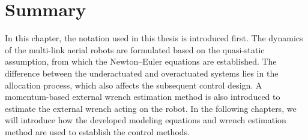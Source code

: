 \section{Summary}
In this chapter, the notation used in this thesis is introduced first. The dynamics of the multi-link aerial robots are formulated based on the quasi-static assumption, from which the Newton--Euler equations are established. The difference between the underactuated and overactuated systems lies in the allocation process, which also affects the subsequent control design. A momentum-based external wrench estimation method is also introduced to estimate the external wrench acting on the robot. In the following chapters, we will introduce how the developed modeling equations and wrench estimation method are used to establish the control methods.

